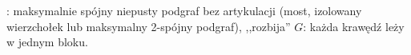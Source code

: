 :  maksymalnie spójny niepusty podgraf bez artykulacji (most, izolowany wierzchołek lub maksymalny 2-spójny podgraf), ,,rozbija'' $G$: każda krawędź leży w jednym bloku.